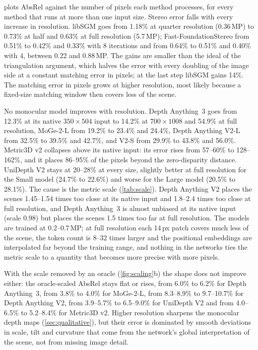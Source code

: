 \documentclass[10pt,twocolumn]{article}
\begin{document}
 plots AbsRel against the number of pixels each method processes, for every method
that runs at more than one input size. Stereo error falls with every increase in resolution. libSGM
goes from 1.18\% at quarter resolution (0.36\,MP) to 0.73\% at half and 0.63\% at full resolution
(5.7\,MP); Fast-FoundationStereo from 0.51\% to 0.42\% and 0.33\% with 8 iterations and from 0.64\% to
0.51\% and 0.40\% with 4, between 0.22 and 0.88\,MP. The gains are smaller than the ideal of the
triangulation argument, which halves the error with every doubling of the image side at a constant
matching error in pixels; at the last step libSGM gains 14\%. The matching error in pixels grows at
higher resolution, most likely because a fixed-size matching window then covers less of the scene.

No monocular model improves with resolution. Depth Anything~3 goes from 12.3\% at its native
$350\times504$ input to 14.2\% at $700\times1008$ and 54.9\% at full resolution, MoGe-2-L from 19.2\%
to 23.4\% and 24.4\%, Depth Anything V2-L from 32.5\% to 39.5\% and 42.7\%, and V2-S from 29.9\% to
43.8\% and 56.0\%. Metric3D v2 collapses above its native input: its error rises from 57--60\% to
128--162\%, and it places 86--95\% of the pixels beyond the zero-disparity distance. UniDepth V2 stays
at 20--28\% at every size, slightly better at full resolution for the Small model (24.7\% to 22.6\%)
and worse for the Large model (20.5\% to 28.1\%). The cause is the metric scale (\cref{tab:scale}).
Depth Anything V2 places the scenes 1.45--1.54 times too close at its native input and 1.8--2.4 times
too close at full resolution, and Depth Anything~3 is almost unbiased at its native input (scale 0.98)
but places the scenes 1.5 times too far at full resolution. The models are trained at 0.2--0.7\,MP; at
full resolution each 14\,px patch covers much less of the scene, the token count is 8--32 times larger
and the positional embeddings are interpolated far beyond the training range, and nothing in the
networks ties the metric scale to a quantity that becomes more precise with more pixels.

With the scale removed by an oracle (\cref{fig:scaling}b) the shape does not improve either: the
oracle-scaled AbsRel stays flat or rises, from 6.0\% to 6.2\% for Depth Anything~3, from 3.8\% to
4.0\% for MoGe-2-L, from 8.3--8.9\% to 9.7--10.7\% for Depth Anything V2, from 3.9--5.7\% to 6.5--9.0\%
for UniDepth V2 and from 4.0--6.5\% to 5.2--8.4\% for Metric3D v2. Higher resolution sharpens
the monocular depth maps (\cref{sec:qualitative}), but their error is dominated by smooth deviations in
scale, tilt and curvature that come from the network's global interpretation of the scene, not from
missing image detail.
\end{document}
